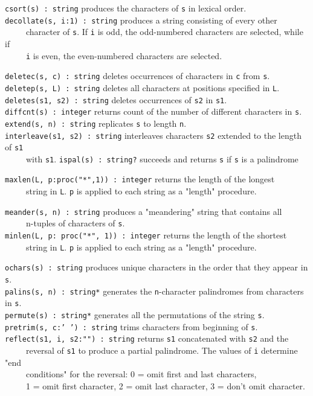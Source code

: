 \texttt{csort(s) : string} produces the characters of \texttt{s} in
lexical order.\\
\texttt{decollate(s, i:1) : string} produces a string consisting of
every other\\
 \ \ \ \ \ character of \texttt{s}. If \texttt{i} is odd, the
odd-numbered characters are selected, while if\\
 \ \ \ \ \ \texttt{i} is even, the even-numbered characters are selected.

\texttt{deletec(s, c) : string} deletes occurrences of characters in
\texttt{c} from \texttt{s}.\\
\texttt{deletep(s, L) : string} deletes all characters at positions
specified in \texttt{L}.\\
\texttt{deletes(s1, s2) : string} deletes occurrences of \texttt{s2} in
\texttt{s1}.\\
\texttt{diffcnt(s) : integer} returns count of the number of different
characters in \texttt{s}.\\
\texttt{extend(s, n) : string} replicates \texttt{s} to length
\texttt{n}.\\
\texttt{interleave(s1, s2) : string} interleaves characters \texttt{s2}
extended to the length of \texttt{s1}\\
 \ \ \ \ \  with \texttt{s1}.
\texttt{ispal(s) : string?} succeeds and returns \texttt{s} if
\texttt{s} is a palindrome

\texttt{maxlen(L, p:proc("*",1)) : integer}
returns the length of the longest\\
 \ \ \ \ \ string in \texttt{L}. \texttt{p} is applied to each string as
a "length" procedure.

\texttt{meander(s, n) : string} produces a
"meandering" string that contains
all\\
 \ \ \ \ \ n-tuples of characters of \texttt{s}.\\
\texttt{minlen(L, p: proc("*", 1)) :
integer} returns the length of the shortest\\
 \ \ \ \ \ string in \texttt{L}. \texttt{p} is applied to each string as
a "length" procedure.

\texttt{ochars(s) : string} produces unique characters in the order that
they appear in \texttt{s}.\\
\texttt{palins(s, n) : string*} generates the \texttt{n}{}-character
palindromes from characters in \texttt{s}.\\
\texttt{permute(s) : string*} generates all the permutations of the
string \texttt{s}.\\
\texttt{pretrim(s, c:' ') : string}
trims characters from beginning of \texttt{s}.\\
\texttt{reflect(s1, i, s2:"") : string}
returns \texttt{s1} concatenated with \texttt{s2} and the\\
 \ \ \ \ \ reversal of \texttt{s1} to produce a partial palindrome. The
values of \texttt{i} determine "end\\
 \ \ \ \ \ conditions" for the reversal: 0 = omit first
and last characters,\\
 \ \ \ \ \ 1 = omit first character, 2 = omit last character, 3 =
don't omit character.

